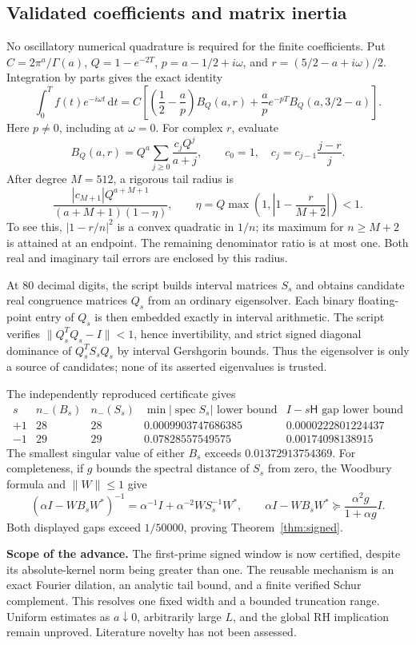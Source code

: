 \documentclass[11pt,letterpaper]{article}
\newcommand{\dd}{\mathrm d}
\begin{document}
\subsection*{Validated coefficients and matrix inertia}
No oscillatory numerical quadrature is required for the finite coefficients. Put $C=2\pi^a/\Gamma(a)$, $Q=1-e^{-2T}$,
$p=a-1/2+i\omega$, and $r=(5/2-a+i\omega)/2$. Integration by parts gives the exact identity
\[
 \int_0^T f(t)e^{-i\omega t}\,\dd t
 =C\left[\left(\frac12-\frac ap\right)B_Q(a,r)
       +\frac ap e^{-pT}B_Q(a,3/2-a)\right].
\]
Here $p\ne0$, including at $\omega=0$. For complex $r$, evaluate
\[
 B_Q(a,r)=Q^a\sum_{j\geq0}\frac{c_jQ^j}{a+j},\qquad
 c_0=1,\quad c_j=c_{j-1}\frac{j-r}{j}.
\]
After degree $M=512$, a rigorous tail radius is
\[
 \frac{|c_{M+1}|Q^{a+M+1}}{(a+M+1)(1-\eta)},\qquad
 \eta=Q\max\left(1,\left|1-\frac{r}{M+2}\right|\right)<1.
\]
To see this, $|1-r/n|^2$ is a convex quadratic in $1/n$; its maximum for $n\geq M+2$ is attained at an endpoint. The remaining denominator ratio is at most one. Both real and imaginary tail errors are enclosed by this radius.

At 80 decimal digits, the script builds interval matrices $S_s$ and obtains candidate real congruence matrices $Q_s$ from an ordinary eigensolver. Each binary floating-point entry of $Q_s$ is then embedded exactly in interval arithmetic. The script verifies $\|Q_s^TQ_s-I\|<1$, hence invertibility, and strict signed diagonal dominance of $Q_s^TS_sQ_s$ by interval Gershgorin bounds. Thus the eigensolver is only a source of candidates; none of its asserted eigenvalues is trusted.

The independently reproduced certificate gives
\[
 \begin{array}{c|cc|cc}
 s&n_-(B_s)&n_-(S_s)&\min|\operatorname{spec}S_s|\text{ lower bound}
 &I-s\mathsf H\text{ gap lower bound}\\\hline
 +1&28&28&0.0009903747686385&0.0000222801224437\\
 -1&29&29&0.07828557549575&0.00174098138915
 \end{array}
\]
The smallest singular value of either $B_s$ exceeds $0.01372913754369$. For completeness, if $g$ bounds the spectral distance of $S_s$ from zero, the Woodbury formula and $\|W\|\leq1$ give
\[
 (\alpha I-WB_sW^*)^{-1}
 =\alpha^{-1}I+\alpha^{-2}WS_s^{-1}W^*,\qquad
 \alpha I-WB_sW^*\succeq\frac{\alpha^2g}{1+\alpha g}I.
\]
Both displayed gaps exceed $1/50000$, proving Theorem~\ref{thm:signed}.

\textbf{Scope of the advance.} The first-prime signed window is now certified, despite its absolute-kernel norm being greater than one. The reusable mechanism is an exact Fourier dilation, an analytic tail bound, and a finite verified Schur complement. This resolves one fixed width and a bounded truncation range. Uniform estimates as $a\downarrow0$, arbitrarily large $L$, and the global RH implication remain unproved. Literature novelty has not been assessed.
\end{document}
